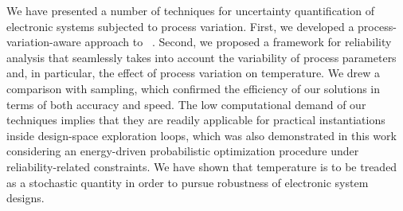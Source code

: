 We have presented a number of techniques for uncertainty quantification of electronic systems subjected to process variation.
First, we developed a process-variation-aware approach to \DSS\ \ta.
Second, we proposed a framework for reliability analysis that seamlessly takes into account the variability of process parameters and, in particular, the effect of process variation on temperature.
We drew a comparison with  sampling, which confirmed the efficiency of our solutions in terms of both accuracy and speed.
The low computational demand of our techniques implies that they are readily applicable for practical instantiations inside design-space exploration loops, which was also demonstrated in this work considering an energy-driven probabilistic optimization procedure under reliability-related constraints.
We have shown that temperature is to be treaded as a stochastic quantity in order to pursue robustness of electronic system designs.
